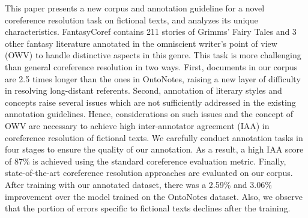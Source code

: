 This paper presents a new corpus and annotation guideline for a novel coreference resolution task on fictional texts, and analyzes its unique characteristics. FantasyCoref contains 211 stories of Grimms' Fairy Tales and 3 other fantasy literature annotated in the omniscient writer's point of view (OWV) to handle distinctive aspects in this genre. This task is more challenging than general coreference resolution in two ways. First, documents in our corpus are 2.5 times longer than the ones in OntoNotes, raising a new layer of difficulty in resolving long-distant referents. Second, annotation of literary styles and concepts raise several issues which are not sufficiently addressed in the existing annotation guidelines. Hence, considerations on such issues and the concept of OWV are necessary to achieve high inter-annotator agreement (IAA) in coreference resolution of fictional texts. We carefully conduct annotation tasks in four stages to ensure the quality of our annotation. As a result, a high IAA score of 87\% is achieved using the standard coreference evaluation metric. Finally, state-of-the-art coreference resolution approaches are evaluated on our corpus. After training with our annotated dataset, there was a 2.59\% and 3.06\% improvement over the model trained on the OntoNotes dataset. Also, we observe that the portion of errors specific to fictional texts declines after the training.
